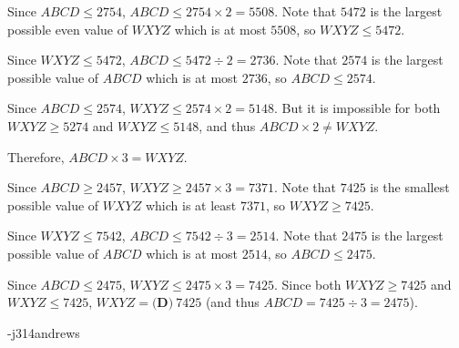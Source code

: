 \begin{enumerate}
 Since $ABCD \leq 2754$, $ABCD \leq 2754 \times 2= 5508$.  Note that $5472$ is the largest possible even value of $WXYZ$ which is at most $5508$, so $WXYZ \leq 5472$.

 Since $WXYZ \leq 5472$, $ABCD \leq 5472 \div 2 = 2736$.  Note that $2574$ is the largest possible value of $ABCD$ which is at most $2736$, so $ABCD \leq 2574$.

 Since $ABCD \leq 2574$, $WXYZ \leq 2574 \times 2 = 5148$.  But it is impossible for both $WXYZ \geq 5274$ and $WXYZ \leq 5148$, and thus $ABCD \times 2 \neq WXYZ$.

 Therefore, $ABCD \times 3 = WXYZ$.

 Since $ABCD \geq 2457$, $WXYZ \geq 2457 \times 3 = 7371$.  Note that $7425$ is the smallest possible value of $WXYZ$ which is at least $7371$, so $WXYZ \geq 7425$.

 Since $WXYZ \leq 7542$, $ABCD \leq 7542 \div 3 = 2514$.  Note that $2475$ is the largest possible value of $ABCD$ which is at most $2514$, so $ABCD \leq 2475$.

 Since $ABCD \leq 2475$, $WXYZ \leq 2475 \times 3 = 7425$.  Since both $WXYZ \geq 7425$ and $WXYZ \leq 7425$, $WXYZ = \boxed{\textbf{(D)}\ 7425}$ (and thus $ABCD = 7425 \div 3 = 2475$).

 -j314andrews

 


\end{enumerate}